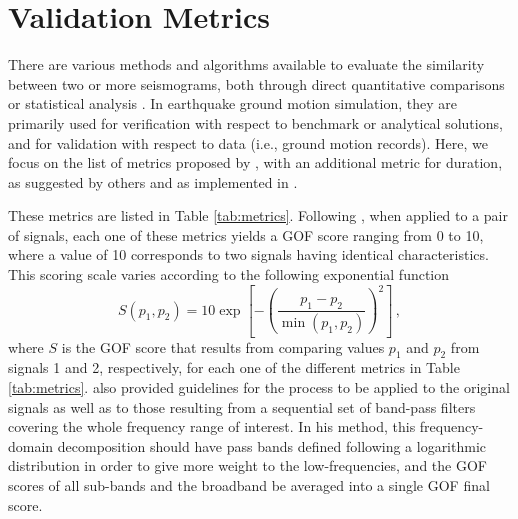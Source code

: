 
\section{Validation Metrics} 
\label{sec:validation-metrics}

There are various methods and algorithms available to evaluate the similarity between two or more seismograms, both through direct  quantitative comparisons or  statistical analysis \citep[e.g.,][]{Anderson_2004_Proc, Kristekova_2006_BSSA, Kristekova_2009_GJI, Olsen_2010_SRL, Burks_BSSA_2014, Rezaeian_2015_BSSA}. In earthquake ground motion simulation, they are primarily used for verification with respect to benchmark or analytical solutions, and for validation with respect to data (i.e., ground motion records). Here, we focus on the list of metrics proposed by \citet{Anderson_2004_Proc}, with an additional metric for duration, as suggested by others \citep{Olsen_2010_SRL, Maufroy_2015_BSSA} and as implemented in \citet{Taborda_2013_BSSA}.



These metrics are listed in Table \ref{tab:metrics}. Following \citet{Anderson_2004_Proc}, when applied to a pair of signals, each one of these metrics yields a GOF score ranging from 0 to 10, where a value of 10 corresponds to two signals having identical characteristics. This scoring scale varies according to the following exponential function
% 
\begin{equation}
\label{eq:gof-function}
	S \left( p_1, p_2 \right) = 10 \exp{ \left[ - \left( \frac{p_1 - p_2}{ \min\left( p_1, p_2 \right) } \right)^2 \right] }
	\, ,
\end{equation}
% 
\noindent
where $S$ is the GOF score that results from comparing values $p_1$ and $p_2$ from signals 1 and 2, respectively, for each one of the different metrics in Table \ref{tab:metrics}.  \citeauthor{Anderson_2004_Proc} also provided guidelines for the process to be applied to the original signals as well as to those resulting from a sequential set of band-pass filters covering the whole frequency range of interest. In his method, this frequency-domain decomposition should have pass bands defined following a logarithmic distribution in order to give more weight to the low-frequencies, and the GOF scores of all sub-bands and the broadband be averaged into a single GOF final score. 

